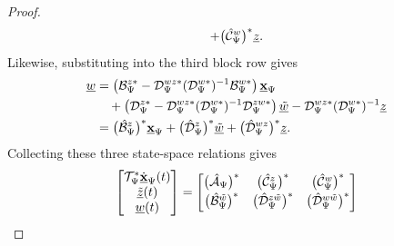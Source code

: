 \begin{proof}
\begin{align*}
        +
        \bigl(\hat{\mathcal{C}}_\Psi^{w}\bigr)^*
            \underline{z}.
    \end{align*}
    Likewise, substituting into the third block row gives
    \begin{align*}
        \underline{w}
        &=
        \left(
            \mathcal{B}_\Psi^{z*}
            -
            \mathcal{D}_\Psi^{wz*}(\mathcal{D}_\Psi^{w*})^{-1}
            \mathcal{B}_\Psi^{w*}
        \right)\underline{\mathbf{x}}_\Psi\\
        &\quad+
        \left(
            \mathcal{D}_\Psi^{z*}
            -
            \mathcal{D}_\Psi^{wz*}(\mathcal{D}_\Psi^{w*})^{-1}
            \mathcal{D}_\Psi^{zw*}
        \right)\underline{\tilde{w}}
        -
        \mathcal{D}_\Psi^{wz*}(\mathcal{D}_\Psi^{w*})^{-1}
            \underline{z}\\
        &=
        \bigl(\hat{\mathcal{B}}_\Psi^{z}\bigr)^*
            \underline{\mathbf{x}}_\Psi
        +
        \bigl(\hat{\mathcal{D}}_\Psi^{z}\bigr)^*
            \underline{\tilde{w}}
        +
        \bigl(\hat{\mathcal{D}}_\Psi^{wz}\bigr)^*
            \underline{z}.
    \end{align*}
    Collecting these three state-space relations gives
    \begin{equation}\label{eqn:dualpg}
    \begin{bmatrix}\mathcal{T}_\Psi^*\dot{\underline{\mathbf{x}}}_\Psi(t) \\ \underline{\tilde{z}}(t) \\ \underline{w}(t)\end{bmatrix}
    =
    \begin{bmatrix}
    \bigl(\hat{\mathcal{A}}_\Psi\bigr)^*
    &
    \bigl(\hat{\mathcal{C}}_\Psi^{z}\bigr)^*
    &
    \bigl(\hat{\mathcal{C}}_\Psi^{w}\bigr)^*
    \\[2pt]
    
    \bigl(\hat{\mathcal{B}}_\Psi^{\tilde{w}}\bigr)^*
    &
    \bigl(\hat{\mathcal{D}}_\Psi^{z\tilde{w}}\bigr)^*
    &
    \bigl(\hat{\mathcal{D}}_\Psi^{w\tilde{w}}\bigr)^*
    \\[2pt]
    
\end{bmatrix}
\end{equation}
\end{proof}
